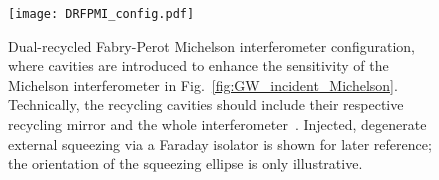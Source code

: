 

\begin{figure}
	\centering
	\texttt{[image: DRFPMI\_config.pdf]}
	\caption{Dual-recycled Fabry-Perot Michelson interferometer configuration, where cavities are introduced to enhance the sensitivity of the Michelson interferometer in Fig.~\ref{fig:GW_incident_Michelson}. Technically, the recycling cavities should include their respective recycling mirror and the whole interferometer~\cite{meersRecyclingLaserinterferometricGravitationalwave1988,1995AuJPh..48..953M}. Injected, degenerate external squeezing via a Faraday isolator is shown for later reference; the orientation of the squeezing ellipse is only illustrative.}
	\label{fig:DRFPMI}
\end{figure}

